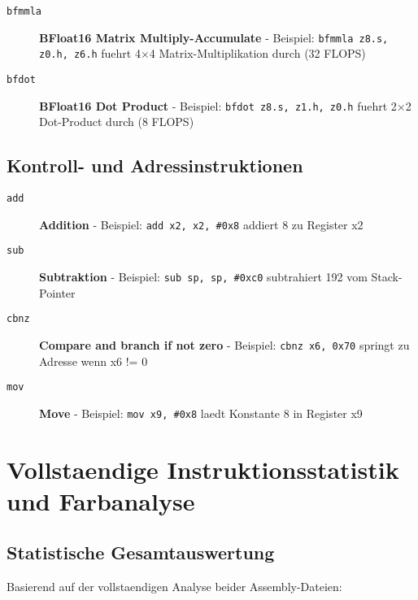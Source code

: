 \documentclass[11pt,a4paper]{article}
\begin{document}
\begin{description}
\item[\texttt{bfmmla}] \textbf{BFloat16 Matrix Multiply-Accumulate} - Beispiel: \texttt{bfmmla z8.s, z0.h, z6.h} fuehrt 4$\times$4 Matrix-Multiplikation durch (32 FLOPS)
\item[\texttt{bfdot}] \textbf{BFloat16 Dot Product} - Beispiel: \texttt{bfdot z8.s, z1.h, z0.h} fuehrt 2$\times$2 Dot-Product durch (8 FLOPS)
\end{description}

\subsection{Kontroll- und Adressinstruktionen}

\begin{description}
\item[\texttt{add}] \textbf{Addition} - Beispiel: \texttt{add x2, x2, \#0x8} addiert 8 zu Register x2
\item[\texttt{sub}] \textbf{Subtraktion} - Beispiel: \texttt{sub sp, sp, \#0xc0} subtrahiert 192 vom Stack-Pointer
\item[\texttt{cbnz}] \textbf{Compare and branch if not zero} - Beispiel: \texttt{cbnz x6, 0x70} springt zu Adresse wenn x6 != 0
\item[\texttt{mov}] \textbf{Move} - Beispiel: \texttt{mov x9, \#0x8} laedt Konstante 8 in Register x9
\end{description}

\section{Vollstaendige Instruktionsstatistik und Farbanalyse}

\subsection{Statistische Gesamtauswertung}

Basierend auf der vollstaendigen Analyse beider Assembly-Dateien:
\end{document}
